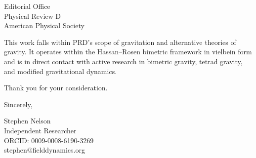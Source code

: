 \documentclass[11pt]{letter}
\begin{document}
\begin{letter}{Editorial Office\\Physical Review D\\American Physical Society}

This work falls within PRD's scope of gravitation and alternative theories of gravity. It operates within the Hassan--Rosen bimetric framework in vielbein form and is in direct contact with active research in bimetric gravity, tetrad gravity, and modified gravitational dynamics.

Thank you for your consideration.

\closing{Sincerely,}

Stephen Nelson\\
Independent Researcher\\
ORCID: 0009-0008-6190-3269\\
stephen@fielddynamics.org

\end{letter}
\end{document}
